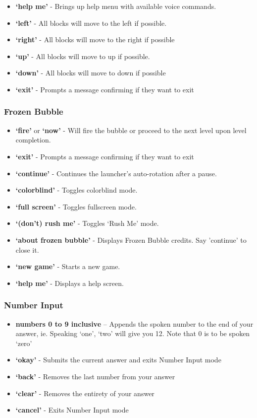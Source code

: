 \documentclass[11pt, oneside]{article}
\begin{document}
\begin{itemize}
  	\item {\bf`help me'} - Brings up help menu with available voice commands. 
	\item {\bf`left'} - All blocks will move to the left if possible. 
	\item {\bf`right'} - All blocks will move to the right if possible
	\item {\bf`up'} - All blocks will move to up if possible. 
	\item {\bf`down'} - All blocks will move to down if possible
	\item {\bf`exit'} - Prompts a message confirming if they want to exit
	
\end{itemize}

\subsubsection{Frozen Bubble}

\begin{itemize}
	\item {\bf`fire'} or {\bf`now'} - Will fire the bubble or proceed to the next
	level upon level completion.
	\item {\bf`exit'} - Prompts a message confirming if they want to exit
	\item {\bf`continue'} - Continues the launcher's auto-rotation after a pause.
	\item {\bf`colorblind'} - Toggles colorblind mode.
	\item {\bf`full screen'} - Toggles fullscreen mode.
	\item {\bf`(don't) rush me'} - Toggles `Rush Me' mode.
	\item {\bf`about frozen bubble'} - Displays Frozen Bubble credits. Say 'continue'
	to close it.
	\item {\bf`new game'} - Starts a new game.
	\item {\bf`help me'} - Displays a help screen.
	
\end{itemize}

\subsubsection{Number Input}
\begin{itemize}
  \item {\bf numbers 0 to 9 inclusive} – Appends the spoken number
    to the end of your answer, ie. Speaking `one', `two' will give you
    12. Note that 0 is to be spoken `zero'
  \item {\bf `okay'} - Submits the current answer and exits Number
    Input mode
  \item {\bf `back'} - Removes the last number from your answer
  \item {\bf `clear'} - Removes the entirety of your answer
  \item {\bf `cancel'} - Exits Number Input mode
\end{itemize}
\end{document}
